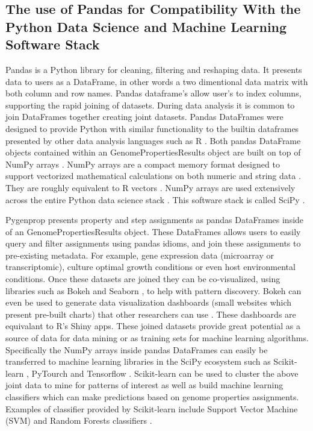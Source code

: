 \subsection{The use of Pandas for Compatibility With the Python Data Science and Machine Learning Software Stack}

Pandas is a Python library for cleaning, filtering and reshaping data. It presents data to users as a DataFrame, in other words a two dimentional data matrix with both column and row names. Pandas dataframe's allow user's to index columns, supporting the rapid joining of datasets. During data analysis it is common to join DataFrames together creating joint datasets. Pandas DataFrames were designed to provide Python with similar functionality to the builtin dataframes presented by other data analysis languages such as R \cite{rprogman}. Both pandas DataFrame objects contained within an GenomePropertiesResults object are built on top of NumPy arrays \cite{mckinney2010data}. NumPy arrays are a compact memory format designed to support vectorized mathematical calculations on both numeric and string data \cite{van2011numpy}. They are roughly equivalent to R vectors \cite{rprogman}. NumPy arrays are used extensively across the entire Python data science stack . This software stack is called SciPy \cite{scipystack}.

Pygenprop presents property and step assignments as pandas DataFrames inside of an GenomePropertiesResults object. These DataFrames allows users to easily query and filter assignments using pandas idioms, and join these assignments to pre-existing metadata. For example, gene expression data (microarray or transcriptomic), culture optimal growth conditions or even host environmental conditions. Once these datasets are joined they can be co-visualized, using libraries such as Bokeh \cite{bokeh} and Seaborn \cite{seaborn}, to help with pattern discovery. Bokeh can even be used to generate data visualization dashboards (small websites which present pre-built charts) that other researchers can use \cite{bokeh}. These dashboards are equivalant to R's Shiny apps. These joined datasets provide great potential as a source of data for data mining or as training sets for machine learning algorithms. Specifically the NumPy arrays inside pandas DataFrames can easily be transferred to machine learning libraries in the SciPy ecosystem such as Scikit-learn \cite{pedregosa2011scikit}, PyTourch \cite{Paszke2017} and Tensorflow \cite{abadi2016tensorflow}. Scikit-learn can be used to cluster the above joint data to mine for patterns of interest as well as build machine learning classifiers which can make predictions based on genome properties assignments. Examples of classifier provided by Scikit-learn include Support Vector Machine (SVM) and Random Forests classifiers \cite{pedregosa2011scikit}.

